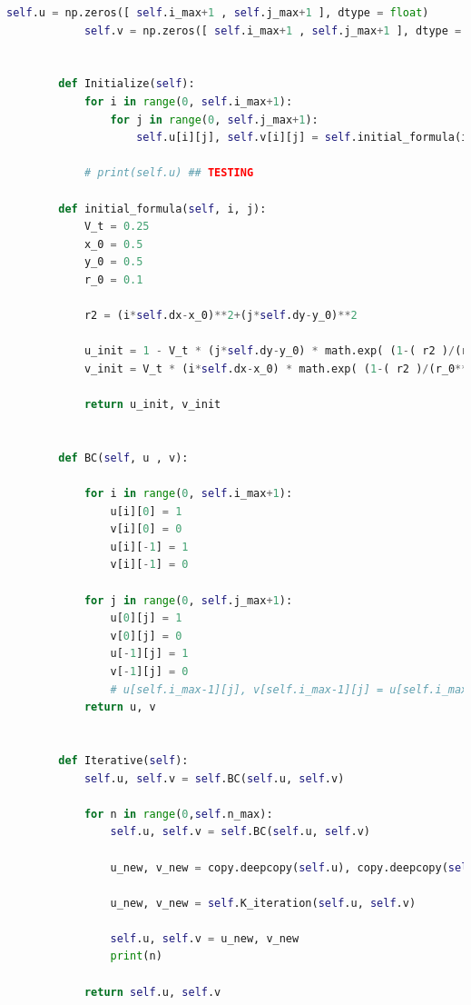 \documentclass[12pt]{article}
\begin{document}
\begin{scriptsize}
\begin{lstlisting}[language=python,caption={ADI Solver}]
            self.u = np.zeros([ self.i_max+1 , self.j_max+1 ], dtype = float)
            self.v = np.zeros([ self.i_max+1 , self.j_max+1 ], dtype = float)
    
    
        def Initialize(self):
            for i in range(0, self.i_max+1):
                for j in range(0, self.j_max+1):
                    self.u[i][j], self.v[i][j] = self.initial_formula(i, j)
    
            # print(self.u) ## TESTING 
    
        def initial_formula(self, i, j):
            V_t = 0.25
            x_0 = 0.5
            y_0 = 0.5
            r_0 = 0.1
    
            r2 = (i*self.dx-x_0)**2+(j*self.dy-y_0)**2
    
            u_init = 1 - V_t * (j*self.dy-y_0) * math.exp( (1-( r2 )/(r_0**2)) / (2) )
            v_init = V_t * (i*self.dx-x_0) * math.exp( (1-( r2 )/(r_0**2)) / (2) )
    
            return u_init, v_init
        
    
        def BC(self, u , v):
    
            for i in range(0, self.i_max+1):
                u[i][0] = 1
                v[i][0] = 0
                u[i][-1] = 1
                v[i][-1] = 0
            
            for j in range(0, self.j_max+1):
                u[0][j] = 1
                v[0][j] = 0
                u[-1][j] = 1
                v[-1][j] = 0
                # u[self.i_max-1][j], v[self.i_max-1][j] = u[self.i_max][j], v[self.i_max][j]
            return u, v
        
    
        def Iterative(self):
            self.u, self.v = self.BC(self.u, self.v)
            
            for n in range(0,self.n_max):
                self.u, self.v = self.BC(self.u, self.v)
                
                u_new, v_new = copy.deepcopy(self.u), copy.deepcopy(self.v)
                
                u_new, v_new = self.K_iteration(self.u, self.v)
    
                self.u, self.v = u_new, v_new
                print(n)
            
            return self.u, self.v
                     
    
    
    
    
    
    

\end{lstlisting}
\end{scriptsize}
\end{document}
